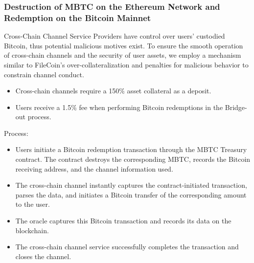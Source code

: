 \documentclass{article}
\begin{document}
\subsubsection{Destruction of MBTC on the Ethereum Network and Redemption on the Bitcoin Mainnet}
Cross-Chain Channel Service Providers have control over users' custodied Bitcoin, thus potential malicious motives exist. To ensure the smooth operation of cross-chain channels and the security of user assets, we employ a mechanism similar to FileCoin's over-collateralization and penalties for malicious behavior to constrain channel conduct.
\begin{itemize}
    \item Cross-chain channels require a 150\% asset collateral as a deposit.
    \item Users receive a 1.5\% fee when performing Bitcoin redemptions in the Bridge-out process.
\end{itemize}
Process:
\begin{itemize}
    \item Users initiate a Bitcoin redemption transaction through the MBTC Treasury contract. The contract destroys the corresponding MBTC, records the Bitcoin receiving address, and the channel information used.
    \item The cross-chain channel instantly captures the contract-initiated transaction, parses the data, and initiates a Bitcoin transfer of the corresponding amount to the user.
    \item The oracle captures this Bitcoin transaction and records its data on the blockchain.
    \item The cross-chain channel service successfully completes the transaction and closes the channel.
\end{itemize}
\end{document}
